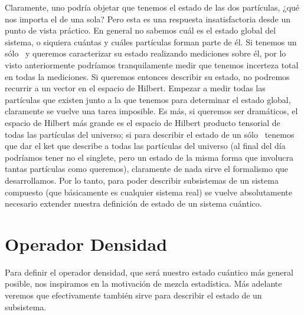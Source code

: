 \documentclass[10pt, a4paper]{article}
\numberwithin{equation}{subsection}
\begin{document}
Claramente, uno podría objetar que tenemos el estado de las dos partículas, 
¿qué nos importa el de una sola? Pero esta es una respuesta insatisfactoria
desde un punto de vista práctico. En general no sabemos cuál es el estado
global del sistema, o siquiera cuántas y cuáles partículas forman parte de él.
Si tenemos un sólo \spin~y queremos caracterizar su estado realizando
mediciones sobre él, por lo visto anteriormente podríamos tranquilamente medir
que tenemos incerteza total en todas la mediciones. Si queremos entonces
describir su estado, no podremos recurrir a un vector en el espacio de Hilbert.
Empezar a medir todas las partículas que existen junto a la que tenemos para
determinar el estado global, claramente se vuelve una tarea imposible. Es más,
si queremos ser dramáticos, el espacio de Hilbert más grande es el espacio de
Hilbert producto tensorial de todas las partículas del universo; si para
describir el estado de un sólo \spin~tenemos que dar el ket que describe a
todas las partículas del universo (al final del día podríamos tener no el
singlete, pero un estado de la misma forma que involucra tantas partículas como
queremos), claramente de nada sirve el formalismo que desarrollamos. Por lo
tanto, para poder describir subsistemas de un sistema compuesto (que
básicamente es cualquier sistema real) se vuelve absolutamente necesario
extender nuestra definición de estado de un sistema cuántico.

\section{Operador Densidad}

Para definir el operador densidad, que será nuestro estado cuántico más general
posible, nos inspiramos en la motivación de mezcla estadística. Más adelante
veremos que efectivamente también sirve para describir el estado de un
subsistema.
\end{document}

